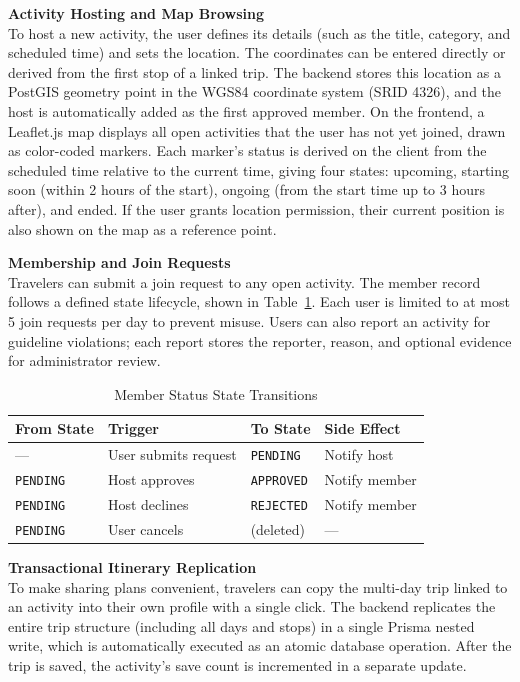 \documentclass[a4paper,12pt]{report}
\begin{document}
\textbf{Activity Hosting and Map Browsing}
\\ To host a new activity, the user defines its details (such as the title, category, and scheduled time) and sets the location. The coordinates can be entered directly or derived from the first stop of a linked trip. The backend stores this location as a PostGIS geometry point in the WGS84 coordinate system (SRID 4326), and the host is automatically added as the first approved member. On the frontend, a Leaflet.js map displays all open activities that the user has not yet joined, drawn as color-coded markers. Each marker's status is derived on the client from the scheduled time relative to the current time, giving four states: upcoming, starting soon (within 2 hours of the start), ongoing (from the start time up to 3 hours after), and ended. If the user grants location permission, their current position is also shown on the map as a reference point.

\textbf{Membership and Join Requests}
\\ Travelers can submit a join request to any open activity. The member record follows a defined state lifecycle, shown in Table~\ref{tab:member_states}. Each user is limited to at most 5 join requests per day to prevent misuse. Users can also report an activity for guideline violations; each report stores the reporter, reason, and optional evidence for administrator review.

\begin{table}[H]
\centering
\small
\renewcommand{\arraystretch}{1.2}
\begin{tabular}{|p{2.5cm}|p{4cm}|p{2.5cm}|p{4.5cm}|}
\hline
\textbf{From State} & \textbf{Trigger} & \textbf{To State} & \textbf{Side Effect} \\ \hline
--- & User submits request & \texttt{PENDING} & Notify host \\ \hline
\texttt{PENDING} & Host approves & \texttt{APPROVED} & Notify member \\ \hline
\texttt{PENDING} & Host declines & \texttt{REJECTED} & Notify member \\ \hline
\texttt{PENDING} & User cancels & (deleted) & --- \\ \hline
\end{tabular}
\caption{Member Status State Transitions}
\label{tab:member_states}
\end{table}

\textbf{Transactional Itinerary Replication}
\\ To make sharing plans convenient, travelers can copy the multi-day trip linked to an activity into their own profile with a single click. The backend replicates the entire trip structure (including all days and stops) in a single Prisma nested write, which is automatically executed as an atomic database operation. After the trip is saved, the activity's save count is incremented in a separate update.
\end{document}
